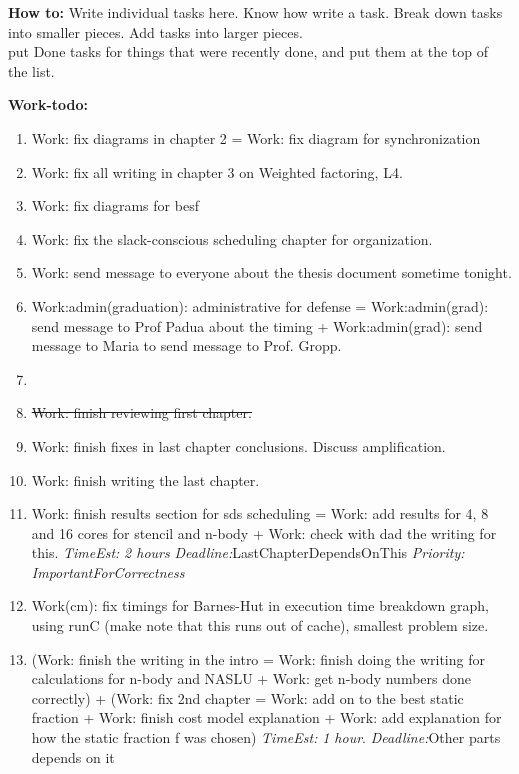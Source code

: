 \documentclass[11pt]{article}
\newcommand{\doneTask}[1]{\item \sout{#1}}
\newcommand{\te}[1]{\textit{TimeEst:} \textit{#1}}
\newcommand{\pr}[1]{\textit{Priority:} \textit{#1}}
\newcommand{\dl}[1]{\textit{Deadline:}#1}
\begin{document}
\newpage 
\textbf{How to:} Write individual tasks here. Know how write a task. 
Break down tasks into smaller pieces. Add tasks into larger
pieces. \\ put Done tasks for things that were recently done, and put
them at the top of the list. 


 
\textbf{Work-todo:}\\
\begin{enumerate}

\item Work: fix diagrams in chapter 2 = Work: fix diagram for synchronization  

\item Work: fix all writing in chapter 3 on Weighted factoring, L4. 
\item Work: fix diagrams for besf 


\item Work: fix the slack-conscious scheduling chapter for organization. 
\item Work: send message to everyone about the thesis document
  sometime tonight. 
\item Work:admin(graduation): administrative for defense  =
  Work:admin(grad): send message to Prof Padua about the timing +
  Work:admin(grad): send message to Maria to send message to
  Prof. Gropp. 

\item \doneTask{Work: finish reviewing first chapter. } 

\item Work: finish fixes in last chapter conclusions. Discuss amplification. 

\item Work: finish writing the last chapter. 

\item Work: finish results section for sds scheduling = Work: add
  results for 4, 8 and 16 cores for stencil and n-body + Work: check
  with dad the writing for this. \te{2 hours}
  \dl{LastChapterDependsOnThis} \pr{ImportantForCorrectness}

\item Work(cm): fix timings for Barnes-Hut in execution time breakdown
  graph, using runC (make note that this runs out of cache), smallest
  problem size. 

\item (Work: finish the writing in the intro  =  Work: finish doing
 the writing for calculations for n-body and NASLU  + Work: get n-body
 numbers done correctly) + (Work: fix 2nd chapter  = Work: add on to the 
best static fraction  +  Work: finish cost model explanation + Work:
add explanation for how the static fraction f was chosen)  \te{1 hour}. \dl{Other
    parts depends on it}


\end{enumerate}
\end{document}
